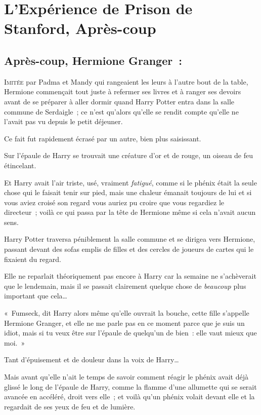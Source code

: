 \chapter{L'Expérience de Prison de Stanford, Après-coup}

\section{Après-coup, Hermione Granger~:}

\lettrine{I}{mitée} par Padma et Mandy qui rangeaient les leurs à l'autre bout de la table, Hermione commençait tout juste à refermer ses livres et à ranger ses devoirs avant de se préparer à aller dormir quand Harry Potter entra dans la salle commune de Serdaigle~; ce n'est qu'alors qu'elle se rendit compte qu'elle ne l'avait pas vu depuis le petit déjeuner.

Ce fait fut rapidement écrasé par un autre, bien plus saisissant.

Sur l'épaule de Harry se trouvait une créature d'or et de rouge, un oiseau de feu étincelant.

Et Harry avait l'air triste, usé, vraiment \emph{fatigué}, comme si le phénix était la seule chose qui le faisait tenir sur pied, mais une chaleur émanait toujours de lui et si vous aviez croisé son regard vous auriez pu croire que vous regardiez le directeur~; voilà ce qui passa par la tête de Hermione même si cela n'avait aucun sens.

Harry Potter traversa péniblement la salle commune et se dirigea vers Hermione, passant devant des sofas emplis de filles et des cercles de joueurs de cartes qui le fixaient du regard.

Elle ne reparlait théoriquement pas encore à Harry car la semaine ne s'achèverait que le lendemain, mais il se passait clairement quelque chose de \emph{beaucoup} plus important que cela…

«~Fumseck, dit Harry alors même qu'elle ouvrait la bouche, cette fille s'appelle Hermione Granger, et elle ne me parle pas en ce moment parce que je suis un idiot, mais si tu veux être sur l'épaule de quelqu'un de bien~: elle vaut mieux que moi.~»

Tant d'épuisement et de douleur dans la voix de Harry…

Mais avant qu'elle n'ait le temps de savoir comment réagir le phénix avait déjà glissé le long de l'épaule de Harry, comme la flamme d'une allumette qui se serait avancée en accéléré, droit vers elle~; et voilà qu'un phénix volait devant elle et la regardait de ses yeux de feu et de lumière.

